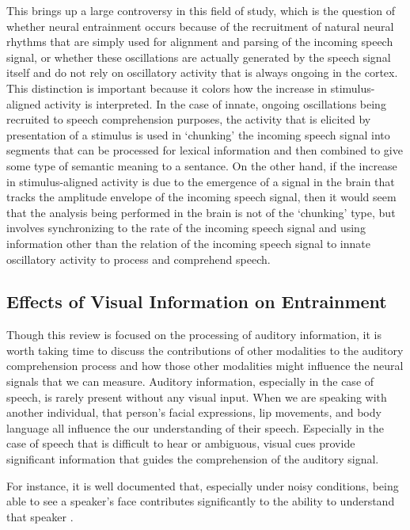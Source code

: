 \documentclass[titlepage]{article}
\begin{document}
    This brings up a large controversy in this field of study, which is the question of whether
    neural entrainment occurs because of the recruitment of natural neural rhythms that are simply
    used for alignment and parsing of the incoming speech signal, or whether these oscillations are
    actually generated by the speech signal itself and do not rely on oscillatory activity that is
    always ongoing in the cortex. This distinction is important because it colors how the increase
    in stimulus-aligned activity is interpreted. In the case of innate, ongoing oscillations being
    recruited to speech comprehension purposes, the activity that is elicited by presentation of a
    stimulus is used in `chunking' the incoming speech signal into segments that can be processed
    for lexical information and then combined to give some type of semantic meaning to a sentance.
    On the other hand, if the increase in stimulus-aligned activity is due to the emergence of a
    signal in the brain that tracks the amplitude envelope of the incoming speech signal, then
    it would seem that the analysis being performed in the brain is not of the `chunking' type,
    but involves synchronizing to the rate of the incoming speech signal and using information
    other than the relation of the incoming speech signal to innate oscillatory activity to
    process and comprehend speech.

  \subsection{Effects of Visual Information on Entrainment}

    Though this review is focused on the processing of auditory information, it is worth taking time
    to discuss the contributions of other modalities to the auditory comprehension process and how
    those other modalities might influence the neural signals that we can measure. Auditory information,
    especially in the case of speech, is rarely present without any visual input. When we are speaking
    with another individual, that person's facial expressions, lip movements, and body language all
    influence the our understanding of their speech. Especially in the case of speech that is
    difficult to hear or ambiguous, visual cues provide significant information that guides the
    comprehension of the auditory signal.

    For instance, it is well documented that, especially under noisy  conditions, being able to see
    a speaker's face contributes significantly to the ability to understand that speaker
    \cite{Sumby1954,Erber1969}.
\end{document}
